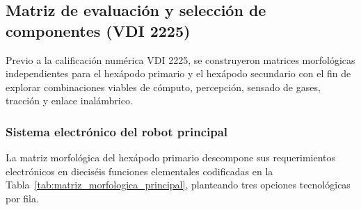 \subsection{Matriz de evaluación y selección de componentes (VDI 2225)}

Previo a la calificación numérica VDI 2225, se construyeron matrices morfológicas independientes para el hexápodo primario y el hexápodo secundario con el fin de explorar combinaciones viables de cómputo, percepción, sensado de gases, tracción y enlace inalámbrico.

\subsubsection{Sistema electrónico del robot principal}

La matriz morfológica del hexápodo primario descompone sus requerimientos electrónicos en dieciséis funciones elementales codificadas en la Tabla~\ref{tab:matriz_morfologica_principal}, planteando tres opciones tecnológicas por fila.

